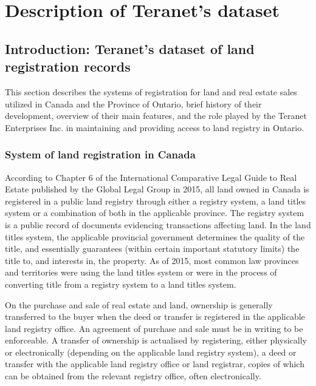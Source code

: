 \chapter{Description of Teranet's dataset} \label{ch:teranet}

\section{Introduction: Teranet's dataset of land registration records} \label{sec:intro_teranet}


This section describes the systems of registration for land and real estate sales utilized in Canada and the Province of Ontario, brief history of their development, overview of their main features, and the role played by the Teranet Enterprises Inc.
in maintaining and providing access to land registry in Ontario.

\subsection{System of land registration in Canada} \label{subsec:land_reg_system_canada}

According to Chapter 6 of the International Comparative Legal Guide to Real Estate published by the Global Legal Group in 2015\cite{McKean2015}, all land owned in Canada is registered in a public land registry through either a registry system, a land titles system or a combination of both in the applicable province.
The registry system is a public record of documents evidencing transactions affecting land.
In the land titles system, the applicable provincial government determines the quality of the title, and essentially guarantees (within certain important statutory limits) the title to, and interests in, the property.
As of 2015, most common law provinces and territories were using the land titles system or were in the process of converting title from a registry system to a land titles system.

On the purchase and sale of real estate and land, ownership is generally transferred to the buyer when the deed or transfer is registered in the applicable land registry office.
An agreement of purchase and sale must be in writing to be enforceable.
A transfer of ownership is actualised by registering, either physically or electronically (depending on the applicable land registry system), a deed or transfer with the applicable land registry office or land registrar, copies of which can be obtained from the relevant registry office, often electronically.

